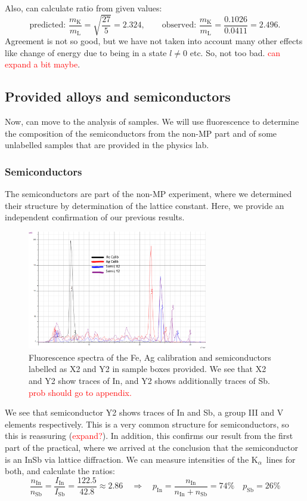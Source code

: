 \documentclass[11pt,a4paper,twoside,onecolumn]{article}
\newcommand{\reminder}[1]{\textcolor{red}{#1}}
\newcommand{\Kalpha}{$\mathrm{K}_\alpha$~}
\begin{document}
Also, can calculate ratio from given values:
\begin{equation}
    \text{predicted: }\frac{m_\mathrm{K}}{m_\mathrm{L}} = \sqrt{\frac{27}{5}} = 2.324,\qquad \text{observed: } \frac{m_\mathrm{K}}{m_\mathrm{L}} = \frac{0.1026}{0.0411} = 2.496.
\end{equation}
Agreement is not so good, but we have not taken into account many other effects like change of energy due to being in a state $l \neq 0$ etc. So, not too bad. \reminder{can expand a bit maybe}.

\subsection{Provided alloys and semiconductors}
Now, can move to the analysis of samples. We will use fluorescence to determine the composition of the semiconductors from the non-MP part and of some unlabelled samples that are provided in the physics lab.

\subsubsection{Semiconductors}
The semiconductors are part of the non-MP experiment, where we determined their structure by determination of the lattice constant. Here, we provide an independent confirmation of our previous results. 
\begin{figure}[!htbp]
    \centering
    \includegraphics[width=0.7\textwidth]{img/spect-semiconductors.png}
    \caption{Fluorescence spectra of the Fe, Ag calibration and semiconductors labelled as X2 and Y2 in sample boxes provided. We see that X2 and Y2 show traces of In, and Y2 shows additionally traces of Sb. \reminder{prob should go to appendix.}}
    \label{fig:spect-semiconductors}
\end{figure}

We see that semiconductor Y2 shows traces of In and Sb, a group III and V elements respectively. This is a very common structure for semiconductors, so this is reassuring (\reminder{expand?}). In addition, this confirms our result from the first part of the practical, where we arrived at the conclusion that the semiconductor is an InSb via lattice diffraction. We can measure intensities of the \Kalpha lines for both, and calculate the ratios:
\begin{equation}
    \frac{n_\mathrm{In}}{n_\mathrm{Sb}} = \frac{I_\mathrm{In}}{I_\mathrm{Sb}} = \frac{122.5}{42.8} \approx 2.86 \quad \Rightarrow \quad p_\mathrm{In} = \frac{n_\mathrm{In}}{n_\mathrm{In}+n_\mathrm{Sb}} = 74 \% \quad p_\mathrm{Sb} = 26 \%
\end{equation}
\end{document}
